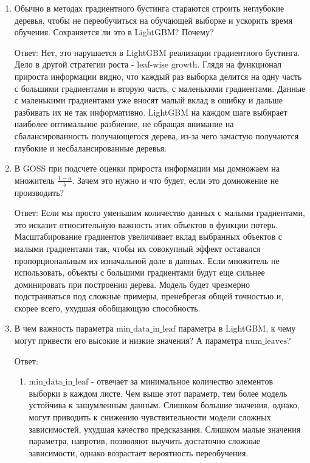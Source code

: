 \begin{enumerate}
    \item Обычно в методах градиентного бустинга стараются строить неглубокие деревья, чтобы не переобучиться на обучающей выборке и ускорить время обучения. Сохраняется ли это в LightGBM? Почему?

          Ответ: Нет, это нарушается в LightGBM реализации градиентного бустинга. Дело в другой стратегии роста - $\text{leaf-wise growth}$. Глядя на функционал прироста информации видно, что каждый раз выборка делится на одну часть с большими градиентами и вторую часть, с маленькими градиентами. Данные с маленькими градиентами уже вносят малый вклад в ошибку и дальше разбивать их не так информативно. LightGBM на каждом шаге выбирает наиболее оптимальное разбиение, не обращая внимание на сбалансированность получающегося дерева, из-за чего зачастую получаются глубокие и несбалансированные деревья.

    \item В GOSS при подсчете оценки прироста информации мы домножаем на множитель $\frac{1-a}{b}$. Зачем это нужно и что будет, если это домножение не производить?

          Ответ: Если мы просто уменьшим количество данных с малыми градиентами, это исказит относительную важность этих объектов в функции потерь. Масштабирование градиентов увеличивает вклад выбранных объектов с малыми градиентами так, чтобы их совокупный эффект оставался пропорциональным их изначальной доле в данных. Если множитель не использовать, объекты с большими градиентами будут еще сильнее доминировать при построении дерева. Модель будет чрезмерно подстраиваться под сложные примеры, пренебрегая общей точностью и, скорее всего, ухудшая обобщающую способность.

    \item В чем важность параметра $\text{min\_data\_in\_leaf}$ параметра в LightGBM, к чему могут привести его высокие и низкие значения? А параметра \newline $\text{num\_leaves}$?

          Ответ: \begin{enumerate}
              \item $\text{min\_data\_in\_leaf}$ - отвечает за минимальное количество элементов выборки в каждом листе. Чем выше этот параметр, тем более модель устойчива к зашумленным данным. Слишком большие значения, однако, могут приводить к снижению чувствительности модели сложных зависимостей, ухудшая качество предсказания. Слишком малые значения параметра, напротив, позволяют выучить достаточно сложные зависимости, однако возрастает вероятность переобучения.


\end{enumerate}
\end{enumerate}
